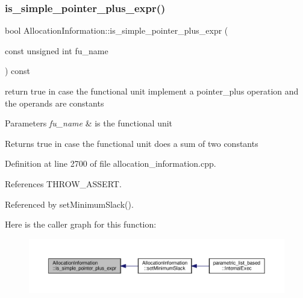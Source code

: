 \subsubsection{\texorpdfstring{is\+\_\+simple\+\_\+pointer\+\_\+plus\+\_\+expr()}{is\_simple\_pointer\_plus\_expr()}}
{\footnotesize\ttfamily bool Allocation\+Information\+::is\+\_\+simple\+\_\+pointer\+\_\+plus\+\_\+expr (\begin{DoxyParamCaption}\item[{const unsigned int}]{fu\+\_\+name }\end{DoxyParamCaption}) const}



return true in case the functional unit implement a pointer\+\_\+plus operation and the operands are constants 


\begin{DoxyParams}{Parameters}
{\em fu\+\_\+name} & is the functional unit \\
\hline
\end{DoxyParams}
\begin{DoxyReturn}{Returns}
true in case the functional unit does a sum of two constants 
\end{DoxyReturn}


Definition at line 2700 of file allocation\+\_\+information.\+cpp.



References T\+H\+R\+O\+W\+\_\+\+A\+S\+S\+E\+RT.



Referenced by set\+Minimum\+Slack().

Here is the caller graph for this function\+:
\nopagebreak
\begin{figure}[H]
\begin{center}
\leavevmode
\includegraphics[width=350pt]{d7/d79/classAllocationInformation_a9cb53d3aaad49e972193e98b8ab81e0a_icgraph}
\end{center}
\end{figure}
\mbox{\label{classAllocationInformation_a6e8cf3c7fb4095970b073e0281907e18}} 
